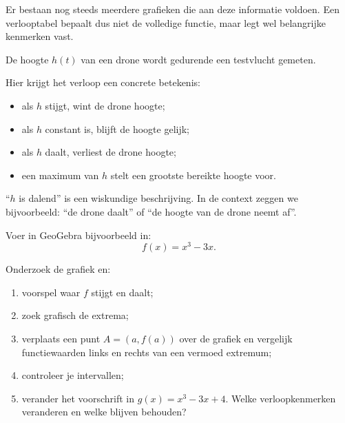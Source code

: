 \documentclass{ximera}
\begin{document}
Er bestaan nog steeds meerdere grafieken die aan deze informatie voldoen.
Een verlooptabel bepaalt dus niet de volledige functie, maar legt wel belangrijke
kenmerken vast.


De hoogte \(h(t)\) van een drone wordt gedurende een testvlucht gemeten.

\begin{center}
\end{center}

Hier krijgt het verloop een concrete betekenis:
\begin{itemize}
  \item als \(h\) stijgt, wint de drone hoogte;
  \item als \(h\) constant is, blijft de hoogte gelijk;
  \item als \(h\) daalt, verliest de drone hoogte;
  \item een maximum van \(h\) stelt een grootste bereikte hoogte voor.
\end{itemize}

\begin{opmerking}[Demathematiseren]
``\(h\) is dalend'' is een wiskundige beschrijving.
In de context zeggen we bijvoorbeeld:
``de drone daalt'' of ``de hoogte van de drone neemt af''.
\end{opmerking}


\begin{geogebra}
Voer in GeoGebra bijvoorbeeld in:
\[
f(x)=x^3-3x.
\]

Onderzoek de grafiek en:
\begin{enumerate}
  \item voorspel waar \(f\) stijgt en daalt;
  \item zoek grafisch de extrema;
  \item verplaats een punt \(A=(a,f(a))\) over de grafiek en vergelijk
        functiewaarden links en rechts van een vermoed extremum;
  \item controleer je intervallen;
  \item verander het voorschrift in \(g(x)=x^3-3x+4\).
        Welke verloopkenmerken veranderen en welke blijven behouden?
\end{enumerate}
\end{geogebra}
\end{document}
